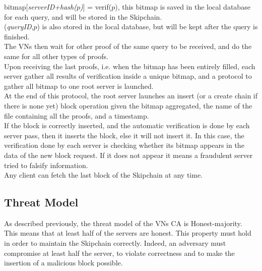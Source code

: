 \documentclass{article}
\begin{document}
bitmap[\textit{serverID+hash($p$)}] = verif($p$), this bitmap is saved in the local database for each query, and will be stored in the Skipchain.\\
(\textit{queryID},$p$) is also stored in the local database, but will be kept after the query is finished.\\
The VNs then wait for other proof of the same query to be received, and do the same for all other types of proofs.\\
Upon receiving the last proofs, i.e. when the bitmap has been entirely filled, each server gather all results of verification inside a unique bitmap, and a protocol to gather all bitmap to one root server is launched.\\
At the end of this protocol, the root server launches an insert (or a create chain if there is none yet) block operation given the bitmap aggregated, the name of the file containing all the proofs, and a timestamp.\\
If the block is correctly inserted, and the automatic verification is done by each server pass, then it inserts the block, else it will not insert it. In this case, the verification done by each server is checking whether its bitmap appears in the data of the new block request. If it does not appear it means a fraudulent server tried to falsify information.\\
Any client can fetch the last block of the Skipchain at any time.

\subsection{Threat Model}
As described previously, the threat model of the VNs CA is Honest-majority. This means that at least half of the servers are honest. This property must hold in order to maintain the Skipchain correctly. Indeed, an adversary must compromise at least half the server, to violate correctness and to make the insertion of a malicious block possible.
\end{document}
